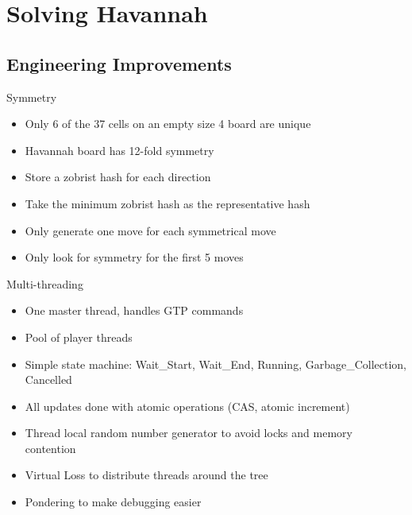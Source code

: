 \documentclass{beamer} %
\begin{document}

\section{Solving Havannah}

\subsection{Engineering Improvements}

\begin{frame}{Symmetry}
\begin{itemize}
\item Only 6 of the 37 cells on an empty size 4 board are unique
\item Havannah board has 12-fold symmetry
\item Store a zobrist hash for each direction
\item Take the minimum zobrist hash as the representative hash
\item Only generate one move for each symmetrical move
\item Only look for symmetry for the first 5 moves
\end{itemize}
\end{frame}


\begin{frame}{Multi-threading}
\begin{itemize}
\item One master thread, handles GTP commands
\item Pool of player threads
\item Simple state machine: Wait\_Start, Wait\_End, Running, Garbage\_Collection, Cancelled
\item All updates done with atomic operations (CAS, atomic increment)
\item Thread local random number generator to avoid locks and memory contention
\item Virtual Loss to distribute threads around the tree
\item Pondering to make debugging easier
\end{itemize}
\end{frame}

\end{document}
